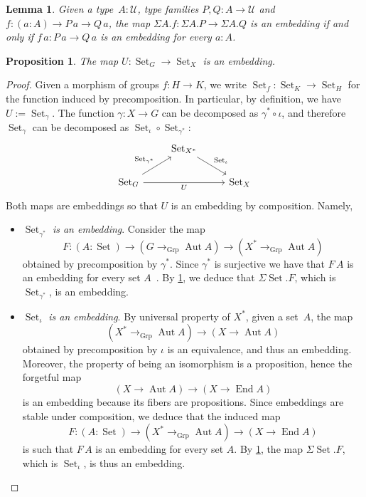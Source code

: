 \documentclass[10pt,a4paper]{amsart}
\newtheorem{proposition}[theorem]{Proposition}
\newtheorem{lemma}[theorem]{Lemma}
\theoremstyle{definition}
\newcommand{\freegroup}[1]{#1^*} %
\newcommand{\defd}{:=} %
\newcommand{\End}{\operatorname{End}} %
\newcommand{\Aut}{\operatorname{Aut}} %
\newcommand{\incl}{\iota} %
\newcommand{\toGroup}{\to_{\operatorname{Grp}}} %
\newcommand{\U}{\mathcal{U}} %
\newcommand{\Set}{\operatorname{Set}} %
\newcommand{\GSet}[1][G]{\Set_{#1}} %
\newcommand{\XSet}[1][X]{\Set_{#1}} %
\begin{document}
\begin{lemma}
  \label{fiberwise-embedding}
  Given a type~$A:\U$, type families $P,Q:A\to\U$ and $f:(a:A)\to P\,a\to Q\,a$, the map $\Sigma A.f:\Sigma A.P\to\Sigma A.Q$ is an embedding if and only
  if $f\,a:P\,a\to Q\,a$ is an embedding for every $a:A$.
\end{lemma}

\begin{proposition}
  The map $U:\GSet\to\XSet$ is an embedding.
\end{proposition}
\begin{proof}
Given a morphism of groups $f:H\to K$, we write $\GSet[f]:\GSet[K]\to\GSet[H]$
for the function induced by precomposition. In particular, by definition, we
have $U\defd\GSet[\gamma]$. The function $\gamma:X\to G$ can be decomposed as
$\freegroup\gamma\circ\incl$, and therefore $\GSet[\gamma]$ can be decomposed as
$\GSet[\incl]\circ\GSet[\freegroup\gamma]$:
\[
  \begin{tikzcd}
    &\GSet[\freegroup X]\ar[dr,"{\GSet[\incl]}"]&\\
    \GSet\ar[ur,"{\GSet[\freegroup\gamma]}"]\ar[rr,"U"']&&\XSet
  \end{tikzcd}
\]
Both maps are embeddings so that $U$ is an embedding by composition. Namely,
\begin{itemize}
\item \emph{$\GSet[\freegroup\gamma]$ is an embedding}. Consider the map
  \[
    F:(A:\Set)\to(G\toGroup\Aut A)\to(\freegroup X\toGroup\Aut A)
  \]
  obtained by precomposition by $\freegroup\gamma$. Since $\freegroup\gamma$ is
  surjective we have that $F\,A$ is an
  embedding for every set $A$~\cite[Lemma~10.1.4]{hottbook}. By \cref{fiberwise-embedding}, we
  deduce that $\Sigma\Set.F$, which is $\GSet[\freegroup\gamma]$, is an
  embedding.
\item \emph{$\GSet[\incl]$ is an embedding}. By universal property of $\freegroup X$, given a set~$A$, the map
  \[
    (\freegroup X\toGroup\Aut A)\to(X\to\Aut A)
  \]
  obtained by precomposition by $\incl$ is an equivalence, and thus an
  embedding. Moreover, the property of being an isomorphism is a proposition, hence the forgetful map
  \[
    (X\to\Aut A)\to(X\to\End A)
  \]
  is an embedding because its fibers are propositions. Since embeddings are
  stable under composition, we deduce that the induced map
  \[
    F:(A:\Set)\to(\freegroup X\toGroup\Aut A)\to(X\to\End A)
  \]
  is such that $F\,A$ is an embedding for every set $A$. By
  \cref{fiberwise-embedding}, the map $\Sigma\Set.F$, which is $\GSet[\incl]$, is
  thus an embedding.\qedhere
\end{itemize}  
\end{proof}
\end{document}
